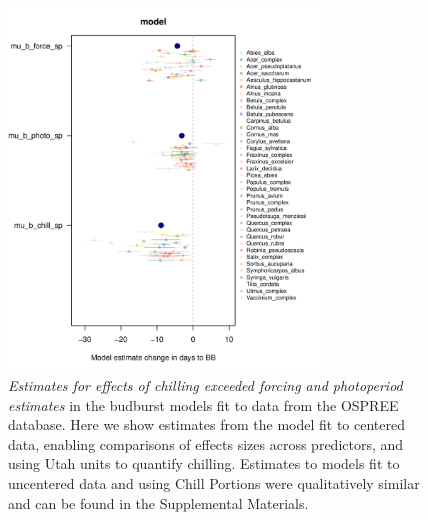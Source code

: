 \documentclass{article}
\begin{document}
\newpage

\begin{figure}[h!]
\centering
\noindent \includegraphics[width=0.75\textwidth]{..//..//analyses/bb_analysis/figures/muplotmodelspcompexprampfputah_z.pdf}
\caption{\emph{Estimates for effects of chilling exceeded forcing and photoperiod estimates} in the budburst models fit to data from the OSPREE database. Here we show estimates from the model fit to centered data, enabling comparisons of effects sizes across predictors, and using Utah units to quantify chilling. Estimates to models fit to uncentered data and using Chill Portions were qualitatively similar and can be found in the Supplemental Materials.} 
\label{fig:mu}
\end{figure}
\end{document}
